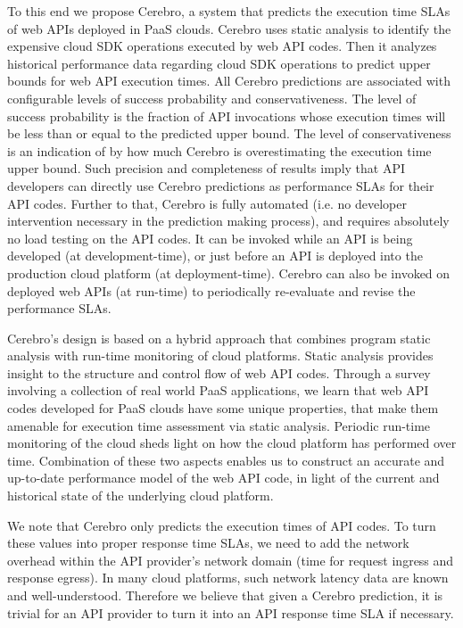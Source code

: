 To this end we propose Cerebro, a system that predicts the execution time SLAs of web APIs
deployed in PaaS clouds. Cerebro uses static analysis to identify the expensive cloud SDK operations
executed by web API codes. Then it analyzes historical performance data regarding cloud SDK
operations to predict upper bounds for web API execution times. All Cerebro predictions
are associated with configurable levels of success probability and conservativeness. The level of 
success probability is the fraction of API invocations whose execution times will be less than or equal to the
predicted upper bound. The level of conservativeness is an indication of by how much Cerebro
is overestimating the execution time upper bound. Such precision and completeness of results
imply that API developers can directly use Cerebro predictions as performance SLAs for their
API codes. Further to that, Cerebro is fully automated (i.e. no developer intervention necessary in
the prediction making process), and requires absolutely no load testing on the API codes. It can be
invoked while an API is being developed (at development-time), or just before an API is deployed
into the production cloud platform (at deployment-time). Cerebro can also be invoked on deployed
web APIs (at run-time) to periodically re-evaluate and revise the performance SLAs.

Cerebro's design is based on a hybrid approach that combines program static analysis with run-time
monitoring of cloud platforms. Static analysis provides insight to the structure and control flow of web
API codes. Through a survey involving a collection
of real world PaaS applications, we learn that web API codes developed for PaaS clouds have
some unique properties, that make them amenable for execution time assessment via static 
analysis. Periodic run-time monitoring of the cloud sheds light on how
the cloud platform has performed over time. Combination of these two aspects enables
us to construct an accurate and up-to-date performance model of the web API code, in light of the 
current and historical state of the underlying cloud platform. 

We note that Cerebro only predicts the
execution times of API codes. To turn these values into proper response time SLAs, we need to
add the network overhead within the API provider's network domain (time for request ingress
and response egress). In many cloud platforms, such network latency data are
known and well-understood. Therefore we believe that given a Cerebro prediction, it is trivial
for an API provider to turn it into an API response time SLA if necessary.

